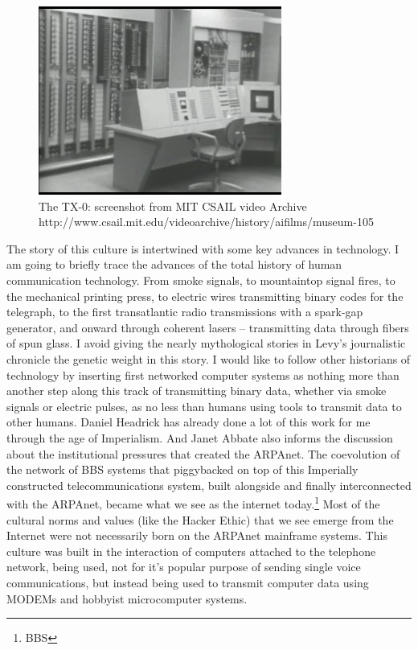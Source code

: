 \documentclass[11pt]{article}
\begin{document}
\begin{figure}[ht!]
\center
\includegraphics[width=80mm]{TX-0.jpg}
\caption{The TX-0: screenshot from MIT CSAIL video Archive http://www.csail.mit.edu/videoarchive/history/aifilms/museum-105}
\end{figure}

The story of this culture is intertwined with some key advances in technology. I am going to briefly trace the advances of the total history of human communication technology. From smoke signals, to mountaintop signal fires, to the mechanical printing press, to electric wires transmitting binary codes for the telegraph, to the first transatlantic radio transmissions with a spark-gap generator, and onward through coherent lasers -- transmitting data through fibers of spun glass. I avoid giving the nearly mythological stories in Levy’s journalistic chronicle the genetic weight in this story.  I would like to follow other historians of technology by inserting first networked computer systems as nothing more than another step along this track of transmitting binary data, whether via smoke signals or electric pulses, as no less than humans using tools to transmit data to other humans. Daniel Headrick has already done a lot of this work for me through the age of Imperialism. And Janet Abbate also informs the discussion about the institutional pressures that created the ARPAnet. The coevolution of the network of BBS systems that piggybacked on top of this Imperially constructed telecommunications system, built alongside and finally interconnected with the ARPAnet, became what we see as the internet today.\footnote{BBS} Most of the cultural norms and values (like the Hacker Ethic) that we see emerge from the Internet were not necessarily born on the ARPAnet mainframe systems. This culture was built in the interaction of computers attached to the telephone network, being used, not for it’s popular purpose of sending single voice communications, but instead being used to transmit computer data using MODEMs and hobbyist microcomputer systems.
\end{document}

